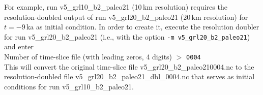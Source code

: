 \documentclass[12pt,a4paper]{article}
\begin{document}
For example, run v5\_grl10\_b2\_paleo21 (10\,km resolution) requires the resolution-doub\-led output of run v5\_grl20\_b2\_paleo21 (20\,km resolution) for $t=-9\,\mathrm{ka}$ as initial condition. In order to create it, execute the resolution doubler for run v5\_grl20\_\-b2\_paleo21 (i.e., with the option \verb+-m v5_grl20_b2_paleo21+) and enter
\\
\hspace*{10mm}Number of time-slice file (with leading zeros, 4 digits) $>$
\verb+0004+
\\
This will convert the original time-slice file v5\_grl20\_b2\_paleo210004.nc to the resolution-doubled file v5\_grl20\_b2\_paleo21\_dbl\_0004.nc that serves as initial conditions for run 
\linebreak{}
v5\_grl10\_b2\_paleo21.

\clearpage
\end{document}
